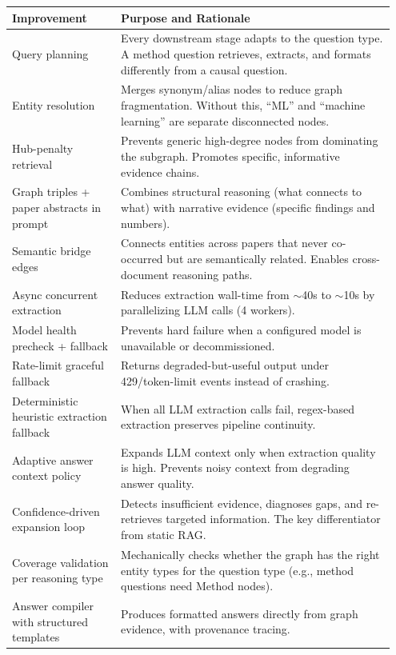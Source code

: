 \documentclass[11pt]{article}
\begin{document}
\begin{longtable}{p{0.27\linewidth}p{0.68\linewidth}}
\toprule
\textbf{Improvement} & \textbf{Purpose and Rationale} \\
\midrule
Query planning & Every downstream stage adapts to the question type. A method question retrieves, extracts, and formats differently from a causal question. \\
Entity resolution & Merges synonym/alias nodes to reduce graph fragmentation. Without this, ``ML'' and ``machine learning'' are separate disconnected nodes. \\
Hub-penalty retrieval & Prevents generic high-degree nodes from dominating the subgraph. Promotes specific, informative evidence chains. \\
Graph triples + paper abstracts in prompt & Combines structural reasoning (what connects to what) with narrative evidence (specific findings and numbers). \\
Semantic bridge edges & Connects entities across papers that never co-occurred but are semantically related. Enables cross-document reasoning paths. \\
Async concurrent extraction & Reduces extraction wall-time from $\sim$40s to $\sim$10s by parallelizing LLM calls (4 workers). \\
Model health precheck + fallback & Prevents hard failure when a configured model is unavailable or decommissioned. \\
Rate-limit graceful fallback & Returns degraded-but-useful output under 429/token-limit events instead of crashing. \\
Deterministic heuristic extraction fallback & When all LLM extraction calls fail, regex-based extraction preserves pipeline continuity. \\
Adaptive answer context policy & Expands LLM context only when extraction quality is high. Prevents noisy context from degrading answer quality. \\
Confidence-driven expansion loop & Detects insufficient evidence, diagnoses gaps, and re-retrieves targeted information. The key differentiator from static RAG. \\
Coverage validation per reasoning type & Mechanically checks whether the graph has the right entity types for the question type (e.g., method questions need Method nodes). \\
Answer compiler with structured templates & Produces formatted answers directly from graph evidence, with provenance tracing. \\

\end{longtable}
\end{document}
